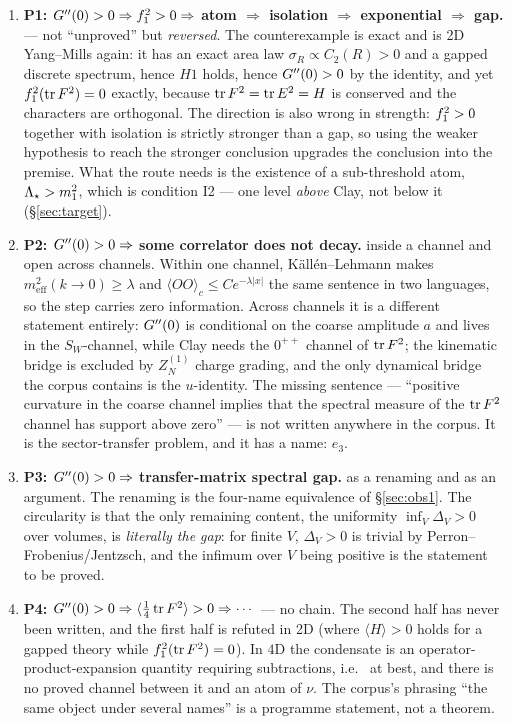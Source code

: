 \begin{enumerate}
\item \textbf{P1: $G''(0)>0\Rightarrow f_1^2>0\Rightarrow$ atom $\Rightarrow$ isolation
$\Rightarrow$ exponential $\Rightarrow$ gap.} \LN{} --- not ``unproved'' but \emph{reversed}. The
counterexample is exact and is 2D Yang--Mills again: it has an exact area law
$\sigma_R\propto C_2(R)>0$ and a gapped discrete spectrum, hence $H1$ holds, hence $G''(0)>0$ by
the identity, and yet $f_1^2(\operatorname{tr} F^{2})=0$ exactly, because $\operatorname{tr} F^{2}=\operatorname{tr} E^{2}=H$ is conserved
and the characters are orthogonal. The direction is also wrong in strength: $f_1^2>0$ together
with isolation is strictly stronger than a gap, so using the weaker hypothesis to reach the
stronger conclusion upgrades the conclusion into the premise. What the route needs is the
existence of a sub-threshold atom, $\Lambda_{\star}>m_1^{2}$, which is condition I2 --- one level
\emph{above} Clay, not below it (\S\ref{sec:target}).
\item \textbf{P2: $G''(0)>0\Rightarrow$ some correlator does not decay.} \LT{} inside a channel and
open across channels. Within one channel, K\"all\'en--Lehmann makes
$m^2_{\mathrm{eff}}(k\to0)\ge\lambda$ and $\langle OO\rangle_c\le Ce^{-\lambda|x|}$ the same
sentence in two languages, so the step carries zero information. Across channels it is a
different statement entirely: $G''(0)$ is conditional on the coarse amplitude $a$ and lives in the
$S_W$-channel, while Clay needs the $0^{++}$ channel of $\operatorname{tr} F^{2}$; the kinematic bridge is
excluded by $Z_N^{(1)}$ charge grading, and the only dynamical bridge the corpus contains is the
$u$-identity. The missing sentence --- ``positive curvature in the coarse channel implies that the
spectral measure of the $\operatorname{tr} F^{2}$ channel has support above zero'' --- is not written anywhere in
the corpus. It is the sector-transfer problem, and it has a name: $e_3$.
\item \textbf{P3: $G''(0)>0\Rightarrow$ transfer-matrix spectral gap.} \LT{} as a renaming and \LN{}
as an argument. The renaming is the four-name equivalence of \S\ref{sec:obs1}. The circularity is
that the only remaining content, the uniformity $\inf_V\Delta_V>0$ over volumes, is \emph{literally
the gap}: for finite $V$, $\Delta_V>0$ is trivial by Perron--Frobenius/Jentzsch, and the
infimum over $V$ being positive is the statement to be proved.
\item \textbf{P4: $G''(0)>0\Rightarrow\langle\tfrac14\operatorname{tr} F^{2}\rangle>0\Rightarrow\cdots$} --- no
chain. The second half has never been written, and the first half is refuted in 2D (where
$\langle H\rangle>0$ holds for a gapped theory while $f_1^2(\operatorname{tr} F^{2})=0$). In $4$D the condensate
is an operator-product-expansion quantity requiring subtractions, i.e.\ \LC{} at best, and there
is no proved channel between it and an atom of $\nu$. The corpus's phrasing ``the same object
under several names'' is a programme statement, not a theorem.
\end{enumerate}

